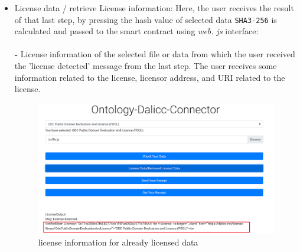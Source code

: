 \begin{itemize}
\begin{center}
\begin{figure}[htb!]
	\end{figure}
	
\end{center}
	\item License data / retrieve License information:
	Here, the user receives the result of that last step, by pressing the hash value of selected data \texttt{SHA3-256} is calculated and passed to the smart contract using \textit{web. js} interface: \\
    \\
	\textbf{- } License information of the selected file or data from which the user received the 'license detected' message from the last step. The user receives some information related to the license, licensor address, and URI related to the license.\\
    \begin{center}
	\begin{figure}[htb!]
		
		\begin{minipage}{0.55\linewidth}
			\centering
			\includegraphics[width=1.95\textwidth]{images/chap03_found_info.png}
		\end{minipage}
		\caption[license information for already licensed data]{license information for already licensed data}
		
	\end{figure}
	

\end{center}
\end{itemize}
